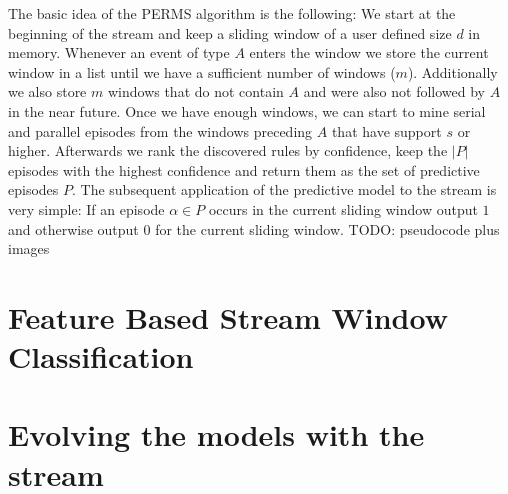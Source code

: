 The basic idea of the PERMS algorithm is the following:
We start at the beginning of the stream and keep a sliding window of a user defined size $d$ in memory. Whenever an event of type $A$ enters the window we store the current window in a list until we have a sufficient number of windows ($m$). Additionally we also store $m$ windows that do not contain $A$ and were also not followed by $A$ in the near future. Once we have enough windows, we can start to mine serial and parallel episodes from the windows preceding $A$ that have support $s$ or higher. Afterwards we rank the discovered rules by confidence, keep the $|P|$ episodes with the highest confidence and return them as the set of predictive episodes $P$.
The subsequent application of the predictive model to the stream is very simple: If an episode $\alpha \in P$ occurs in the current sliding window output $1$ and otherwise output $0$ for the current sliding window.
TODO: pseudocode plus images

\section{Feature Based Stream Window Classification}
\label{sec_FeatureBasedStreamWindowClassification}



\section{Evolving the models with the stream}